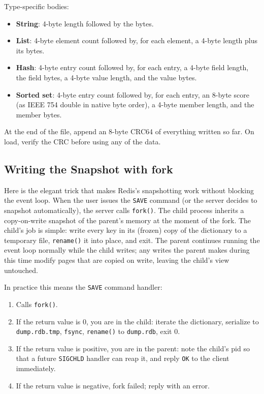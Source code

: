 \documentclass[11pt,a4paper]{article}
\begin{document}
Type-specific bodies:

\begin{itemize}
\item \textbf{String}: 4-byte length followed by the bytes.
\item \textbf{List}: 4-byte element count followed by, for each element, a 4-byte length plus its bytes.
\item \textbf{Hash}: 4-byte entry count followed by, for each entry, a 4-byte field length, the field bytes, a 4-byte value length, and the value bytes.
\item \textbf{Sorted set}: 4-byte entry count followed by, for each entry, an 8-byte score (as IEEE 754 double in native byte order), a 4-byte member length, and the member bytes.
\end{itemize}

At the end of the file, append an 8-byte CRC64 of everything written so far. On load, verify the CRC before using any of the data.

\subsection{Writing the Snapshot with fork}
Here is the elegant trick that makes Redis's snapshotting work without blocking the event loop. When the user issues the \texttt{SAVE} command (or the server decides to snapshot automatically), the server calls \texttt{fork()}. The child process inherits a copy-on-write snapshot of the parent's memory at the moment of the fork. The child's job is simple: write every key in its (frozen) copy of the dictionary to a temporary file, \texttt{rename()} it into place, and exit. The parent continues running the event loop normally while the child writes; any writes the parent makes during this time modify pages that are copied on write, leaving the child's view untouched.

In practice this means the \texttt{SAVE} command handler:

\begin{enumerate}
\item Calls \texttt{fork()}.
\item If the return value is 0, you are in the child: iterate the dictionary, serialize to \texttt{dump.rdb.tmp}, \texttt{fsync}, \texttt{rename()} to \texttt{dump.rdb}, exit 0.
\item If the return value is positive, you are in the parent: note the child's pid so that a future \texttt{SIGCHLD} handler can reap it, and reply \texttt{OK} to the client immediately.
\item If the return value is negative, fork failed; reply with an error.
\end{enumerate}
\end{document}
